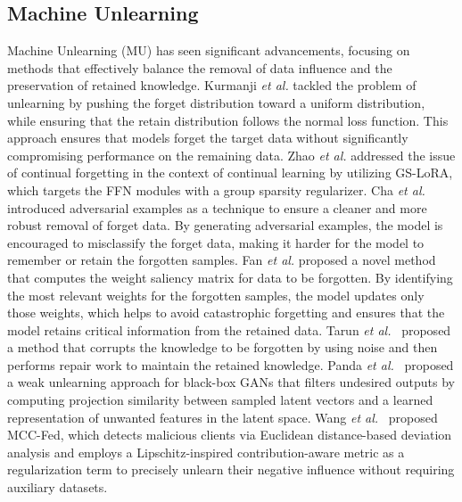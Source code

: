 \subsection{Machine Unlearning}
\label{2.2}
Machine Unlearning (MU) has seen significant advancements, focusing on methods that effectively balance the removal of data influence and the preservation of retained knowledge. Kurmanji \textit{et al.} \cite{kurmanji2023towards} tackled the problem of unlearning by pushing the forget distribution toward a uniform distribution, while ensuring that the retain distribution follows the normal loss function. This approach ensures that models forget the target data without significantly compromising performance on the remaining data. Zhao \textit{ et al.} \cite{zhao2024continual} addressed the issue of continual forgetting in the context of continual learning by utilizing GS-LoRA, which targets the FFN modules with a group sparsity regularizer. Cha \textit{et al.} \cite{cha2024learning} introduced adversarial examples as a technique to ensure a cleaner and more robust removal of forget data. By generating adversarial examples, the model is encouraged to misclassify the forget data, making it harder for the model to remember or retain the forgotten samples. Fan \textit{et al.} \cite{fan2023salun} proposed a novel method that computes the weight saliency matrix for data to be forgotten. By identifying the most relevant weights for the forgotten samples, the model updates only those weights, which helps to avoid catastrophic forgetting and ensures that the model retains critical information from the retained data. Tarun \textit{et al.}~\cite{tarun2023fast} proposed a method that corrupts the knowledge to be forgotten by using noise and then performs repair work to maintain the retained knowledge. Panda \textit{et al.}~\cite{panda2024fast} proposed a weak unlearning approach for black-box GANs that filters undesired outputs by computing projection similarity between sampled latent vectors and a learned representation of unwanted features in the latent space. Wang \textit{et al.}~\cite{wang2025malicious} proposed MCC-Fed, which detects malicious clients via Euclidean distance-based deviation analysis and employs a Lipschitz-inspired contribution-aware metric as a regularization term to precisely unlearn their negative influence without requiring auxiliary datasets.


